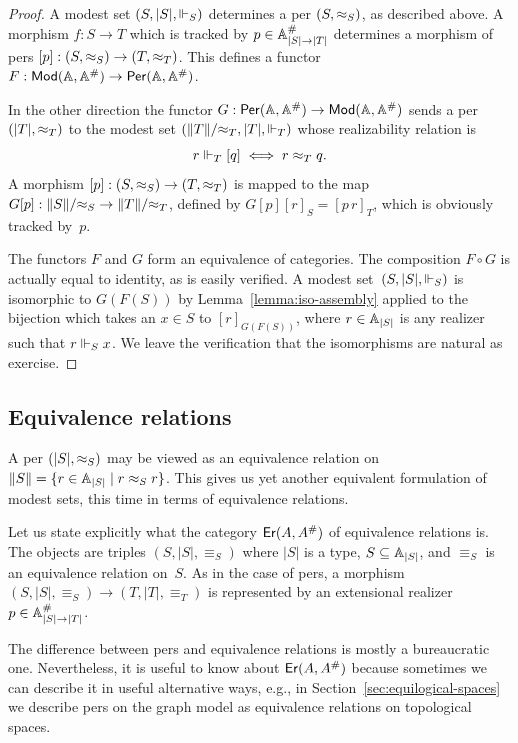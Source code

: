 \begin{proof}
  A modest set $(S, |S|, {\Vdash_{S}})$ determines a per $(S, {\approx_S})$,
  as described above. A morphism $f : S \to T$ which is tracked by $p
  \in \mathbb{A}^{\#}_{|S| \to |T|}$ determines a morphism of pers $[p] : (S,
  {\approx_S}) \to (T, {\approx_T})$. This defines a functor $F : \mathsf{Mod}(\mathbb{A},
    \mathbb{A}^{\#}) \to \mathsf{Per}(\mathbb{A}, \mathbb{A}^{\#})$.

  In the other direction the functor $G : \mathsf{Per}(\mathbb{A}, \mathbb{A}^{\#}) \to
  \mathsf{Mod}(\mathbb{A}, \mathbb{A}^{\#})$ sends a per $(|T|, {\approx_T})$ to the modest set
  $(\|T\|/{\approx_T}, |T|, {\Vdash_T})$ whose realizability relation is
  \begin{equation*}
    r \Vdash_T [q] \iff r \approx_T q.
  \end{equation*}
  A morphism $[p] : (S, {\approx_S}) \to (T, {\approx_T})$ is mapped to the
  map $G [p] : \|S\|/{\approx_S} \to \|T\|/{\approx_T}$, defined by $G [p]
  [r]_S = [p\,r]_T$, which is obviously tracked by~$p$.

  The functors $F$ and $G$ form an equivalence of categories. The
  composition $F \circ G$ is actually equal to identity, as is easily
  verified. A modest set~$(S, |S|, {\Vdash_{S}})$ is isomorphic to
  $G(F(S))$ by Lemma~\ref{lemma:iso-assembly} applied to the bijection
  which takes an $x \in S$ to $[r]_{G(F(S))}$, where $r \in \mathbb{A}_{|S|}$
  is any realizer such that $r \Vdash_S x$. We leave the verification
  that the isomorphisms are natural as exercise.
\end{proof}


\subsection{Equivalence relations}
\label{sec:ers}

A per $(|S|, {\approx_S})$ may be viewed as an equivalence relation on
$\|S\| = \{r \in \mathbb{A}_{|S|} \mid r \approx_S r\}$. This gives us yet
another equivalent formulation of modest sets, this time in terms of
equivalence relations.

Let us state explicitly what the category $\mathsf{Er}(A, A^{\#})$ of
equivalence relations is. The objects are triples $(S, |S|,
{\equiv_S})$ where $|S|$ is a type, $S \subseteq \mathbb{A}_{|S|}$, and
$\equiv_S$ is an equivalence relation on~$S$. As in the case of pers,
a morphism $(S, |S|, {\equiv_S}) \to (T, |T|, {\equiv_T})$ is
represented by an extensional realizer $p \in \mathbb{A}^{\#}_{|S| \to |T|}$.

The difference between pers and equivalence relations is mostly a
bureaucratic one. Nevertheless, it is useful to know about $\mathsf{Er}(A,
  A^{\#})$ because sometimes we can describe it in useful
alternative ways, e.g., in Section~\ref{sec:equilogical-spaces} we
describe pers on the graph model as equivalence relations on
topological spaces.


